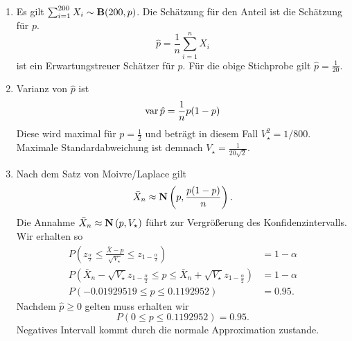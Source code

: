 \solution 
\begin{enumerate}
    \item Es gilt $\sum_{i=1}^{200} X_i \sim \mathbf B(200, p)$. Die Schätzung für
        den Anteil ist die Schätzung für $p$. 
        \begin{equation*}
            \hat p = \frac{1}{n} \sum_{i=1}^{n} X_i
        \end{equation*}
        ist ein Erwartungstreuer Schätzer für $p$. Für die obige Stichprobe
        gilt $\hat p = \frac{1}{20}$.
    \item Varianz von $\hat p$ ist 
        \begin{equation*}
            \operatorname{var} \hat p = \frac{1}{n} p(1-p)
        \end{equation*}
        Diese wird maximal für $p=\frac{1}{2}$ und beträgt in diesem Fall
        $V^{2}_{\star} = 1/800$. Maximale Standardabweichung ist demnach
        $V_{\star} = \frac{1}{20\sqrt{2}}$.
    \item Nach dem Satz von Moivre/Laplace gilt 
        \begin{equation*}
            \bar X_{n} \approx \mathbf N \left( p, \frac{p(1-p)}{n} \right).
        \end{equation*}
        Die Annahme $\bar X_{n} \approx \mathbf N\left( p, V_{\star} \right)$ führt zur 
        Vergrößerung des Konfidenzintervalls. Wir erhalten so
        \begin{align*}
            P\left( z_{\frac{\alpha}{2}} \leq \frac{\bar X - p }{\sqrt{V_{\star}}} \leq z_{1- \frac{\alpha}{2}} \right) &=1-\alpha \\
            P\left( \bar X_{n} -  \sqrt{V_{\star}} z_{1-\frac{\alpha}{2}} \leq p
            \leq \bar X_{n} + \sqrt{V_{\star}} z_{1-\frac{\alpha}{2}}\right) &= 1-\alpha \\
            P\left(  -0.01929519 \leq p \leq 0.1192952  \right) &= 0.95.
        \end{align*}
        Nachdem $\hat p \geq 0$ gelten muss erhalten wir
        \begin{equation*}
            P\left(  0 \leq p \leq 0.1192952  \right) = 0.95.
        \end{equation*}
        Negatives Intervall kommt durch die normale Approximation zustande. 


\end{enumerate}
